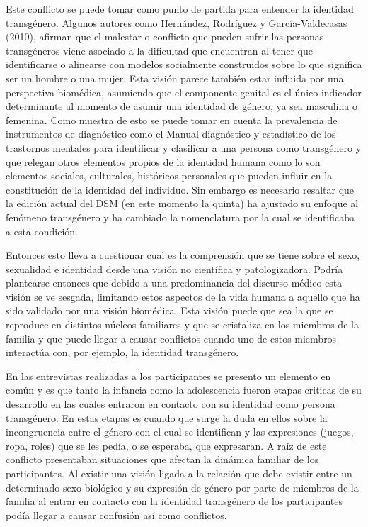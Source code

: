 Este conflicto se puede tomar como punto de partida para entender la identidad
transgénero. Algunos autores como Hernández, Rodríguez y
García-Valdecasas (2010), afirman que el malestar o conflicto que pueden sufrir
las personas transgéneros viene asociado a la dificultad que encuentran al tener
que identificarse o alinearse con modelos socialmente construidos sobre lo que
significa ser un hombre o una mujer. Esta visión parece también estar influida
por una perspectiva biomédica, asumiendo que el componente genital es el único
indicador determinante al momento de asumir una identidad de género, ya sea
masculina o femenina. Como muestra de esto se puede tomar en cuenta la
prevalencia de instrumentos de diagnóstico como el Manual diagnóstico y
estadístico de los trastornos mentales para identificar y clasificar a
una persona como transgénero y que relegan otros elementos propios de la
identidad humana como lo son elementos sociales, culturales,
históricos-personales que pueden influir en la constitución de la identidad del
individuo. Sin embargo es necesario resaltar que la edición actual del DSM
(en este momento la quinta) ha ajustado su enfoque al fenómeno transgénero y ha
cambiado la nomenclatura por la cual se identificaba a esta condición.

Entonces esto lleva a cuestionar cual es la comprensión que se tiene sobre el
sexo, sexualidad e identidad desde una visión no científica y patologizadora.
Podría plantearse entonces que debido a una predominancia del discurso médico
esta visión se ve sesgada, limitando estos aspectos de la vida humana a aquello
que ha sido validado por una visión biomédica. Esta visión puede que sea la
que se reproduce en distintos núcleos familiares y que se cristaliza en los
miembros de la familia y que puede llegar a causar conflictos cuando uno de
estos miembros interactúa con, por ejemplo, la identidad transgénero.

En las entrevistas realizadas a los participantes se presento un elemento en
común y es que tanto la infancia como la adolescencia fueron etapas criticas de
su desarrollo en las cuales entraron en contacto con su identidad como persona
transgénero. En estas etapas es cuando que surge la duda en ellos sobre la
incongruencia entre el género con el cual se identifican y las expresiones
(juegos, ropa, roles) que se les pedía, o se esperaba, que expresaran. A raíz de
este conflicto presentaban situaciones que afectan la dinámica familiar de los
participantes. Al existir una visión ligada a la relación que debe existir
entre un determinado sexo biológico y su expresión de género por parte de
miembros de la familia al entrar en contacto con la identidad transgénero de los
participantes podía llegar a causar confusión así como conflictos.

